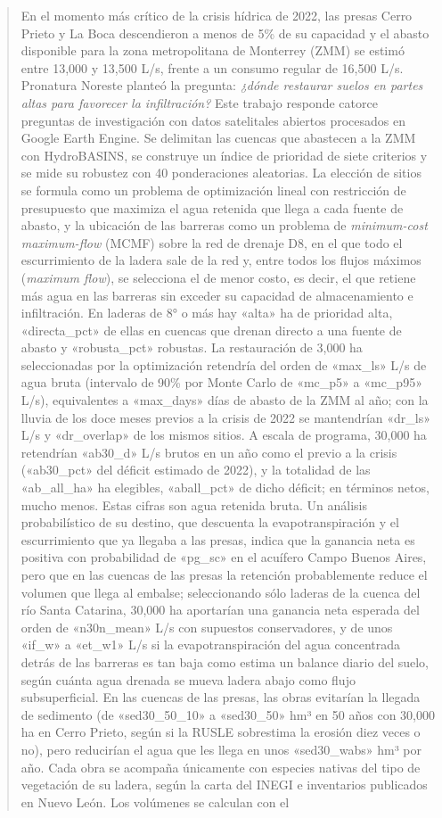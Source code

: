 \begin{abstract}
En el momento más crítico de la crisis hídrica de 2022, las presas Cerro Prieto y La Boca descendieron a menos de 5\% de su capacidad y el abasto disponible para la zona metropolitana de Monterrey (ZMM) se estimó entre 13,000 y 13,500 L/s, frente a un consumo regular de 16,500 L/s. Pronatura Noreste planteó la pregunta: \emph{¿dónde restaurar suelos en partes altas para favorecer la infiltración?} Este trabajo responde catorce preguntas de investigación con datos satelitales abiertos procesados en Google Earth Engine. Se delimitan las cuencas que abastecen a la ZMM con HydroBASINS, se construye un índice de prioridad de siete criterios y se mide su robustez con 40 ponderaciones aleatorias. La elección de sitios se formula como un problema de optimización lineal con restricción de presupuesto que maximiza el agua retenida que llega a cada fuente de abasto, y la ubicación de las barreras como un problema de \emph{minimum-cost maximum-flow} (MCMF) sobre la red de drenaje D8, en el que todo el escurrimiento de la ladera sale de la red y, entre todos los flujos máximos (\emph{maximum flow}), se selecciona el de menor costo, es decir, el que retiene más agua en las barreras sin exceder su capacidad de almacenamiento e infiltración. En laderas de 8° o más hay «alta» ha de prioridad alta, «directa_pct» de ellas en cuencas que drenan directo a una fuente de abasto y «robusta_pct» robustas. La restauración de 3,000 ha seleccionadas por la optimización retendría del orden de «max_ls» L/s de agua bruta (intervalo de 90\% por Monte Carlo de «mc_p5» a «mc_p95» L/s), equivalentes a «max_days» días de abasto de la ZMM al año; con la lluvia de los doce meses previos a la crisis de 2022 se mantendrían «dr_ls» L/s y «dr_overlap» de los mismos sitios. A escala de programa, 30,000 ha retendrían «ab30_d» L/s brutos en un año como el previo a la crisis («ab30_pct» del déficit estimado de 2022), y la totalidad de las «ab_all_ha» ha elegibles, «aball_pct» de dicho déficit; en términos netos, mucho menos. Estas cifras son agua retenida bruta. Un análisis probabilístico de su destino, que descuenta la evapotranspiración y el escurrimiento que ya llegaba a las presas, indica que la ganancia neta es positiva con probabilidad de «pg_sc» en el acuífero Campo Buenos Aires, pero que en las cuencas de las presas la retención probablemente reduce el volumen que llega al embalse; seleccionando sólo laderas de la cuenca del río Santa Catarina, 30,000 ha aportarían una ganancia neta esperada del orden de «n30n_mean» L/s con supuestos conservadores, y de unos «if_w» a «et_w1» L/s si la evapotranspiración del agua concentrada detrás de las barreras es tan baja como estima un balance diario del suelo, según cuánta agua drenada se mueva ladera abajo como flujo subsuperficial. En las cuencas de las presas, las obras evitarían la llegada de sedimento (de «sed30_50_10» a «sed30_50» hm³ en 50 años con 30,000 ha en Cerro Prieto, según si la RUSLE sobrestima la erosión diez veces o no), pero reducirían el agua que les llega en unos «sed30_wabs» hm³ por año. Cada obra se acompaña únicamente con especies nativas del tipo de vegetación de su ladera, según la carta del INEGI e inventarios publicados en Nuevo León. Los volúmenes se calculan con el 
\end{abstract}
